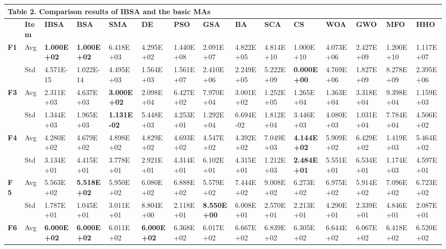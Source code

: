 \documentclass{article} %
\begin{document}
\begin{tabular}{|p{0.2in}|p{0.2in}|p{0.4in}|p{0.4in}|p{0.4in}|p{0.4in}|p{0.4in}|p{0.4in}|p{0.4in}|p{0.4in}|p{0.4in}|p{0.4in}|p{0.4in}|p{0.4in}|p{0.4in}|} \hline 
\multicolumn{13}{|p{4.5in}|}{\textbf{Table }2\textbf{. }Comparison results of IBSA and the basic MAs\textbf{}} & \textbf{} & \textbf{} \\ \hline 
 & \textbf{Item} & \textbf{IBSA} & \textbf{BSA} & \textbf{SMA} & \textbf{DE} & \textbf{PSO} & \textbf{GSA} & \textbf{BA} & \textbf{SCA} & \textbf{CS} & \textbf{WOA} & \textbf{GWO} & \textbf{MFO} & \textbf{HHO} \\ \hline 
\textbf{F1} & Avg & \textbf{1.000E+02} & \textbf{1.000E+02} & 6.418E+03 & 4.295E+02 & 1.440E+08 & 2.091E+07 & 4.822E+05 & 4.814E+10 & 1.000E+10 & 4.073E+06 & 2.427E+09 & 1.200E+10 & 1.117E+07 \\ \hline 
\textbf{} & Std & 4.571E-15 & 1.022E-14 & 4.495E+03 & 1.564E+03 & 1.561E+07 & 2.410E+06 & 2.249E+05 & 5.222E+09 & \textbf{0.000E+00} & 4.769E+06 & 1.827E+09 & 8.278E+09 & 2.395E+06 \\ \hline 
\textbf{F3} & Avg & 2.311E+03 & 4.637E+03 & \textbf{3.000E+02} & 2.098E+04 & 6.427E+02 & 7.970E+04 & 3.001E+02 & 1.252E+05 & 1.265E+04 & 1.363E+04 & 3.318E+04 & 9.398E+04 & 1.159E+03 \\ \hline 
\textbf{} & Std & 1.344E+03 & 1.965E+03 & \textbf{1.131E-02} & 5.448E+03 & 4.253E+01 & 1.292E+04 & 6.694E-02 & 1.812E+04 & 3.446E+03 & 4.080E+03 & 1.031E+04 & 7.784E+04 & 4.506E+02 \\ \hline 
\textbf{F4} & Avg & 4.280E+02 & 4.679E+02 & 4.898E+02 & 4.829E+02 & 4.693E+02 & 4.547E+02 & 4.392E+02 & 7.049E+03 & \textbf{4.144E+02} & 5.909E+02 & 6.429E+02 & 1.419E+03 & 5.464E+02 \\ \hline 
\textbf{} & Std & 3.134E+01 & 4.415E+01 & 3.778E+01 & 2.921E+01 & 4.314E+01 & 6.102E+01 & 4.315E+01 & 1.212E+03 & \textbf{2.484E+01} & 5.551E+01 & 6.534E+01 & 1.174E+03 & 4.597E+01 \\ \hline 
\textbf{F~5} & Avg & 5.563E+02 & \textbf{5.518E+02} & 5.950E+02 & 6.080E+02 & 6.888E+02 & 5.579E+02 & 7.444E+02 & 9.008E+02 & 6.273E+02 & 6.975E+02 & 5.914E+02 & 7.096E+02 & 6.723E+02 \\ \hline 
\textbf{} & Std & 1.787E+01 & 1.045E+01 & 3.011E+01 & 8.804E+00 & 2.118E+01 & \textbf{8.550E+00} & 6.008E+01 & 2.570E+01 & 2.213E+01 & 4.290E+01 & 2.339E+01 & 4.846E+01 & 2.087E+01 \\ \hline 
\textbf{F6} & Avg & \textbf{6.000E+02} & \textbf{6.000E+02} & 6.011E+02 & \textbf{6.000E+02} & 6.368E+02 & 6.017E+02 & 6.667E+02 & 6.839E+02 & 6.305E+02 & 6.644E+02 & 6.067E+02 & 6.418E+02 & 6.520E+02 \\ \hline 

\end{tabular}
\end{document}
